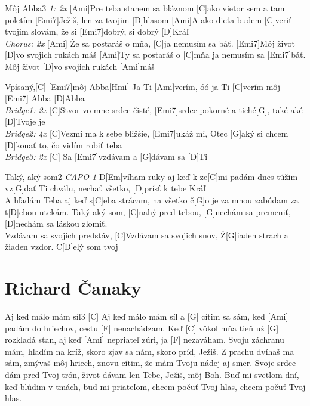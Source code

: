\documentclass[12pt]{article}
\begin{document}
\begin{song}{Môj Abba}{3}
\textit{\color{gray} 1: 2x}
[Ami]Pre teba stanem sa bláznom
[C]ako vietor sem a tam poletím
[Emi7]Ježiš, len za tvojim [D]hlasom
[Ami]A ako dieťa budem [C]veriť
tvojim slovám, že si [Emi7]dobrý,
si dobrý [D]Kráľ
\\
\textit{\color{gray} Chorus: 2x}
[Ami] Že sa postaráš o mňa,
[C]ja nemusím sa báť.
[Emi7]Môj život [D]vo svojich rukách máš
[Ami]Ty sa postaráš o [C]mňa
ja nemusím sa [Emi7]báť.
Môj život [D]vo svojich rukách [Ami]máš

Vpísaný,[C] [Emi7]môj Abba[Hmi]
Ja Ti [Ami]verím, óó ja Ti [C]verím
môj [Emi7] Abba [D]Abba
\\
\textit{\color{gray} Bridge1: 2x}
[C]Stvor vo mne srdce čisté,
[Emi7]srdce pokorné a tiché[G],
také aké [D]Tvoje je
\\
\textit{\color{gray} Bridge2: 4x}
[C]Vezmi ma k sebe bližšie,
[Emi7]ukáž mi, Otec [G]aký si
chcem [D]konať to, čo vidím robiť teba
\\
\textit{\color{gray} Bridge3: 2x}
[C] Sa [Emi7]vzdávam a [G]dávam sa [D]Ti
\end{song}

\begin{song}{Taký, aký som}{2}
\textit{\color{gray} CAPO 1}
D[Em]víham ruky aj keď k ze[C]mi padám
dnes túžim vz[G]dať Ti chválu,
nechať všetko, [D]prísť k tebe Kráľ
\\
[Em]A hľadám Teba aj keď s[C]eba strácam,
na všetko č[G]o je za mnou zabúdam
za t[D]ebou utekám.
\columnbreak
[Em]Taký aký som, 
[C]nahý pred tebou,
[G]nechám sa premeniť, 
[D]nechám sa láskou zlomiť.
\\
[Em]Vzdávam sa svojich predstáv,
[C]Vzdávam sa svojich snov,
Ž[G]iaden strach a žiaden vzdor. 
C[D]elý som tvoj
\end{song}


\newpage

\section{Richard Čanaky}

\begin{song}{Aj keď málo mám síl}{3}
	[C] Aj keď málo mám síl 
	a [G] cítim sa sám,
	keď [Ami] padám do hriechov, 
	cestu [F] nenachádzam.
	Keď [C] vôkol mňa tieň 
	už [G] rozkladá stan,
	aj keď [Ami] nepriateľ zúri, 
	ja [F] nezaváham.
	\columnbreak
	Svoju záchranu mám, 
	hľadím na kríž,
	skoro zjav sa nám, 
	skoro príď, Ježiš.
	Z prachu dvíhaš ma sám, 
	zmývaš môj hriech,
	znovu cítim, že mám 
	Tvoju nádej aj smer.
	\columnbreak
	Svoje srdce dám pred Tvoj 
	trón,
	život dávam len Tebe, 
	Ježiš, môj Boh.
	Buď mi svetlom dní, 
	keď blúdim v tmách,
	buď mi priateľom, 
	chcem počuť Tvoj hlas,
	chcem počuť Tvoj hlas.
\end{song}
\end{document}
